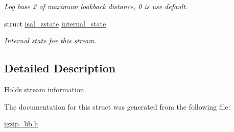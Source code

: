 \begin{DoxyCompactItemize}
\begin{DoxyCompactList}\small\item\em Log base 2 of maximum lookback distance, 0 is use default. \end{DoxyCompactList}\item 
\hypertarget{structisal__zstream_a0cac5165b6c4b21159fb6dfc4a5dc307}{struct \hyperlink{structisal__zstate}{isal\-\_\-zstate} \hyperlink{structisal__zstream_a0cac5165b6c4b21159fb6dfc4a5dc307}{internal\-\_\-state}}\label{structisal__zstream_a0cac5165b6c4b21159fb6dfc4a5dc307}

\begin{DoxyCompactList}\small\item\em Internal state for this stream. \end{DoxyCompactList}\end{DoxyCompactItemize}


\subsection{Detailed Description}
Holds stream information. 

The documentation for this struct was generated from the following file\-:\begin{DoxyCompactItemize}
\item 
\hyperlink{igzip__lib_8h}{igzip\-\_\-lib.\-h}\end{DoxyCompactItemize}
